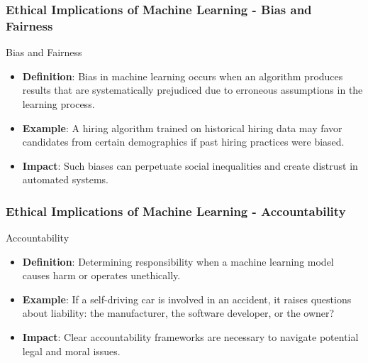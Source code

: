 \documentclass[aspectratio=169]{beamer}
\begin{document}
\begin{frame}[fragile]
  \frametitle{Ethical Implications of Machine Learning - Bias and Fairness}
  \begin{block}{Bias and Fairness}
    \begin{itemize}
      \item \textbf{Definition}: Bias in machine learning occurs when an algorithm produces results that are systematically prejudiced due to erroneous assumptions in the learning process.
      \item \textbf{Example}: A hiring algorithm trained on historical hiring data may favor candidates from certain demographics if past hiring practices were biased.
      \item \textbf{Impact}: Such biases can perpetuate social inequalities and create distrust in automated systems.
    \end{itemize}
  \end{block}
\end{frame}

\begin{frame}[fragile]
  \frametitle{Ethical Implications of Machine Learning - Accountability}
  \begin{block}{Accountability}
    \begin{itemize}
      \item \textbf{Definition}: Determining responsibility when a machine learning model causes harm or operates unethically.
      \item \textbf{Example}: If a self-driving car is involved in an accident, it raises questions about liability: the manufacturer, the software developer, or the owner?
      \item \textbf{Impact}: Clear accountability frameworks are necessary to navigate potential legal and moral issues.
    \end{itemize}
  \end{block}
\end{frame}
\end{document}
